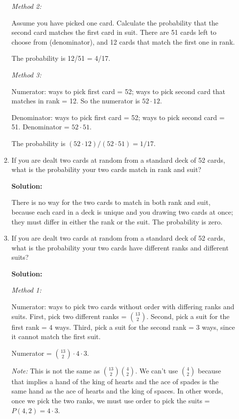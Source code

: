 \documentclass[11pt, letterpaper]{report}
\begin{document}
\begin{enumerate}
\begin{enumerate}
        \emph{Method 2:}
        
        Assume you have picked one card.  Calculate the probability that the second card matches
        the first card in suit.  There are 51 cards left to choose from (denominator), and 
        12 cards that match the first one in rank.
        
        The probability is 12/51 = 4/17.
        
        \emph{Method 3:}
        
        Numerator: ways to pick first card = 52; ways to pick second card that matches in rank
         = 12.  So the numerator is $52 \cdot 12$.
         
        Denominator: ways to pick first card = 52; ways to pick second card = 51.  Denominator
        = $52\cdot 51$.
        
        The probability is $(52\cdot 12)/(52 \cdot 51) = 1/17.$
        
        \item If you are dealt two cards at random from a standard deck of 52 cards, what is the probability your two cards match in rank and suit?
        
        \textbf{Solution:}
        
        There is no way for the two cards to match in both rank and suit, because each card
        in a deck is unique and you drawing two cards at once; they must differ in either
        the rank or the suit.  The probability is zero.
        
        \item If you are dealt two cards at random from a standard deck of 52 cards, what is the probability your two cards have different ranks and different suits?
        
                \textbf{Solution:}
                
        \emph{Method 1:} 
        
        Numerator: ways to pick two cards without order with differing ranks and suits.
        First, pick two different ranks = $\binom{13}{2}$.  Second, pick a suit for the first
        rank = 4 ways.  Third, pick a suit for the second rank = 3 ways, since it cannot match
        the first suit.
        
        Numerator = $\binom{13}{2}\cdot 4 \cdot 3$.
        
        \emph{Note:} This is not the same as $\binom{13}{2}\binom{4}{2}$.  We can't use
        $\binom{4}{2}$ because that implies a hand of the king of hearts and the ace of spades
        is the same hand as the ace of hearts and the king of spaces.  In other words, once we
        pick the two ranks, we must use order to pick the suits = $P(4,2)=4\cdot 3$.
        

\end{enumerate}
\end{enumerate}
\end{document}
